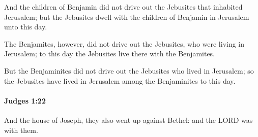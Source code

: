			\begin{versebox}
					\item[BHS] 
					\item[ASV] And the children of Benjamin did not drive out the Jebusites that inhabited Jerusalem; but the Jebusites dwell with the children of Benjamin in Jerusalem unto this day.
					\item[NIV] The Benjamites, however, did not drive out the Jebusites, who were living in Jerusalem; to this day the Jebusites live there with the Benjamites.
					\item[NRSV] But the Benjaminites did not drive out the Jebusites who lived in Jerusalem; so the Jebusites have lived in Jerusalem among the Benjaminites to this day.
			\end{versebox}

		\paragraph{Judges 1:22} %
			\label{JUDGES-1-22}

			And the house of Joseph, they also went up against Bethel: and the LORD was with them.

